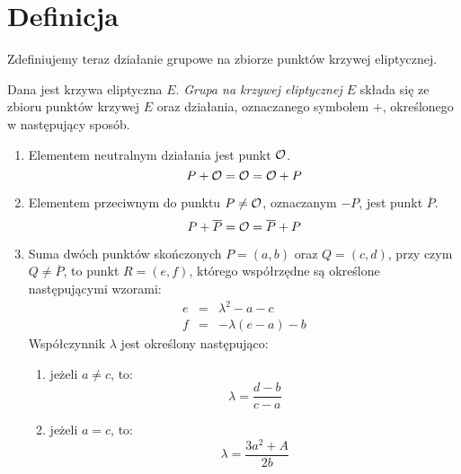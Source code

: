 \section{Definicja}

Zdefiniujemy teraz działanie grupowe na zbiorze punktów krzywej eliptycznej.

\begin{definition}\label{ec_groupop_def}
Dana jest krzywa eliptyczna $E$.
\emph{Grupa na krzywej eliptycznej $E$}
składa się ze zbioru punktów krzywej $E$
oraz działania, oznaczanego symbolem $+$,
określonego w następujący sposób.
\begin{enumerate}
\item\label{ec_groupop_neutral}
Elementem neutralnym działania jest punkt $\mathcal{O}$.
\begin{equation}
P + \mathcal{O} = \mathcal{O} = \mathcal{O} + P
\end{equation}
\item\label{ec_groupop_inverse}
Elementem przeciwnym do punktu $P \neq \mathcal{O}$,
oznaczanym $-P$,
jest punkt $\overline{P}$.
\begin{equation}
P + \overline{P} = \mathcal{O} = \overline{P} + P
\end{equation}
\item\label{ec_groupop_add_generic}
Suma dwóch punktów skończonych $P = (a, b)$ oraz $Q = (c, d)$,
przy czym $Q \neq \overline{P}$, to punkt $R = (e, f)$,
którego współrzędne są określone następującymi wzorami:
\begin{eqnarray}
\label{ec_groupop_add_generic_eqn_x}
e & = & \lambda^2 - a - c \\
\label{ec_groupop_add_generic_eqn_y}
f & = & -\lambda(e - a) - b
\end{eqnarray}
Współczynnik $\lambda$ jest określony następująco:
\begin{enumerate}
\item\label{ec_groupop_add_generic_chord}
jeżeli $a \neq c$, to:
\begin{equation}\label{ec_groupop_add_generic_lambda_chord_eqn}
\lambda = \frac{d-b}{c-a}
\end{equation}
\item\label{ec_groupop_add_generic_tangent}
jeżeli $a = c$, to:
\begin{equation}\label{ec_groupop_add_generic_lambda_tangent_eqn}
\lambda = \frac{3a^2+A}{2b}
\end{equation}
\end{enumerate}
\end{enumerate}
\end{definition}

